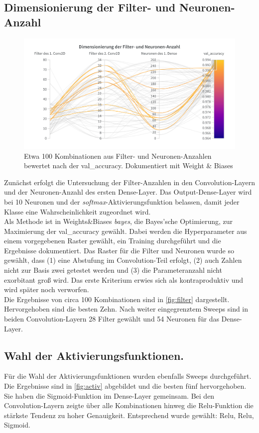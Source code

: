 \documentclass[
fontsize=12pt,					%
paper=a4,						%
twoside=false, 					%
listof=totoc, 					%
bibliography=totoc,				%
titlepage, 						%
headsepline, 					%
DIV=12,							%
BCOR=6mm,						%
cleardoublepage=empty,			%
parskip,							%
ngerman
]{scrartcl}
\begin{document}
\subsection{Dimensionierung der Filter- und Neuronen-Anzahl}

\begin{figure}
	\centering
	\includegraphics[width=0.7\linewidth]{images/Filter}
	\caption{Etwa 100 Kombinationen aus Filter- und Neuronen-Anzahlen bewertet nach der val\_accuracy. Dokumentiert mit Weight \& Biases}
	\label{fig:filter}
\end{figure}

Zunächst erfolgt die Untersuchung der Filter-Anzahlen in den Convolution-Layern und der Neuronen-Anzahl des ersten Dense-Layer. Das Output-Dense-Layer wird bei 10 Neuronen und der \emph{softmax}-Aktivierungsfunktion belassen, damit jeder Klasse eine Wahrscheinlichkeit zugeordnet wird.\\
Als Methode ist in Weights\&Biases \emph{bayes}, die Bayes'sche Optimierung, zur Maximierung der val\_accuracy gewählt. Dabei werden die Hyperparameter aus einem vorgegebenen Raster gewählt, ein Training durchgeführt und die Ergebnisse dokumentiert. Das Raster für die Filter und Neuronen wurde so gewählt, dass (1) eine Abstufung im Convolution-Teil erfolgt, (2) auch Zahlen nicht zur Basis zwei getestet werden und (3) die Parameteranzahl nicht exorbitant groß wird. Das erste Kriterium erwies sich als kontraproduktiv und wird später noch verworfen.\\
Die Ergebnisse von circa 100 Kombinationen sind in \autoref{fig:filter} dargestellt. Hervorgehoben sind die besten Zehn. Nach weiter eingegrenztem Sweeps sind in beiden Convolution-Layern 28 Filter gewählt und 54 Neuronen für das Dense-Layer.

\subsection{Wahl der Aktivierungsfunktionen.}

Für die Wahl der Aktivierungsfunktionen wurden ebenfalls Sweeps durchgeführt. Die Ergebnisse sind in \autoref{fig:activ} abgebildet und die besten fünf hervorgehoben. Sie haben die Sigmoid-Funktion im Dense-Layer gemeinsam. Bei den Convolution-Layern zeigte über alle Kombinationen hinweg die Relu-Funktion die stärkste Tendenz zu hoher Genauigkeit. Entsprechend wurde gewählt: Relu, Relu, Sigmoid.
\end{document}
